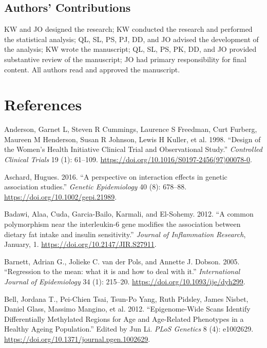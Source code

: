 \documentclass[]{article}
\begin{document}
\hypertarget{authors-contributions}{%
\subsection{Authors' Contributions}\label{authors-contributions}}

KW and JO designed the research; KW conducted the research and performed
the statistical analysis; QL, SL, PS, PJ, DD, and JO advised the
development of the analysis; KW wrote the manuscript; QL, SL, PS, PK,
DD, and JO provided substantive review of the manuscript; JO had primary
responsibility for final content. All authors read and approved the
manuscript.

\hypertarget{references}{%
\section*{References}\label{references}}

\hypertarget{refs}{}
\leavevmode\hypertarget{ref-Anderson1998}{}%
Anderson, Garnet L, Steven R Cummings, Laurence S Freedman, Curt
Furberg, Maureen M Henderson, Susan R Johnson, Lewis H Kuller, et al.
1998. ``Design of the Women's Health Initiative Clinical Trial and
Observational Study.'' \emph{Controlled Clinical Trials} 19 (1):
61--109. \url{https://doi.org/10.1016/S0197-2456(97)00078-0}.

\leavevmode\hypertarget{ref-Aschard2016}{}%
Aschard, Hugues. 2016. ``A perspective on interaction effects in genetic
association studies.'' \emph{Genetic Epidemiology} 40 (8): 678--88.
\url{https://doi.org/10.1002/gepi.21989}.

\leavevmode\hypertarget{ref-Cuda2012}{}%
Badawi, Alaa, Cuda, Garcia-Bailo, Karmali, and El-Sohemy. 2012. ``A
common polymorphism near the interleukin-6 gene modifies the association
between dietary fat intake and insulin sensitivity.'' \emph{Journal of
Inflammation Research}, January, 1.
\url{https://doi.org/10.2147/JIR.S27911}.

\leavevmode\hypertarget{ref-Barnett2005}{}%
Barnett, Adrian G., Jolieke C. van der Pols, and Annette J. Dobson.
2005. ``Regression to the mean: what it is and how to deal with it.''
\emph{International Journal of Epidemiology} 34 (1): 215--20.
\url{https://doi.org/10.1093/ije/dyh299}.

\leavevmode\hypertarget{ref-Bell2012}{}%
Bell, Jordana T., Pei-Chien Tsai, Tsun-Po Yang, Ruth Pidsley, James
Nisbet, Daniel Glass, Massimo Mangino, et al. 2012. ``Epigenome-Wide
Scans Identify Differentially Methylated Regions for Age and Age-Related
Phenotypes in a Healthy Ageing Population.'' Edited by Jun Li.
\emph{PLoS Genetics} 8 (4): e1002629.
\url{https://doi.org/10.1371/journal.pgen.1002629}.
\end{document}
